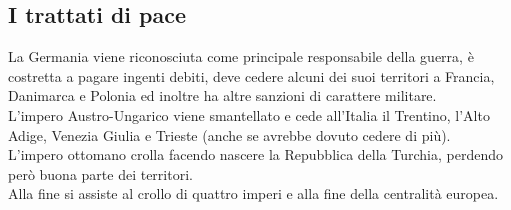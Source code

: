 \documentclass{article}
\begin{document}
\subsection{I trattati di pace}
La Germania viene riconosciuta come principale responsabile della guerra, è costretta a pagare ingenti debiti, deve cedere
alcuni dei suoi territori a Francia, Danimarca e Polonia ed inoltre ha altre sanzioni di carattere militare.\\
L'impero Austro-Ungarico viene smantellato e cede all'Italia il Trentino, l'Alto Adige, Venezia Giulia e Trieste (anche se
avrebbe dovuto cedere di più).\\
L'impero ottomano crolla facendo nascere la Repubblica della Turchia, perdendo però buona parte dei territori.\\
Alla fine si assiste al crollo di quattro imperi e alla fine della centralità europea.
\end{document}
